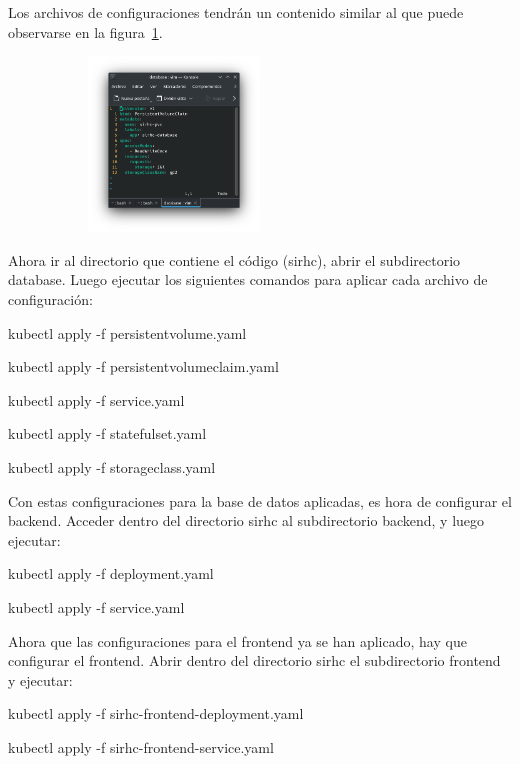 \documentclass[twoside]{article}
\begin{document}
Los archivos de configuraciones tendrán un contenido similar al que puede observarse en la figura~\ref{fig:configuracionKubernetes}.
\begin{figure}[H]
	\caption{Contenido de un archivo de configuración de kubernetes}
    \begin{subfigure}{1\textwidth}
	\includegraphics[width=0.5\textwidth]{configuracionKubernetesEjemplo.png}
    \end{subfigure}
	\label{fig:configuracionKubernetes}
\end{figure}
\vspace{-1.0\baselineskip}

Ahora ir al directorio que contiene el código (sirhc), abrir el subdirectorio database. Luego ejecutar los siguientes comandos para aplicar cada archivo de configuración:

kubectl apply -f persistentvolume.yaml

kubectl apply -f persistentvolumeclaim.yaml

kubectl apply -f service.yaml

kubectl apply -f statefulset.yaml

kubectl apply -f storageclass.yaml

Con estas configuraciones para la base de datos aplicadas, es hora de configurar el backend. Acceder dentro del directorio sirhc al subdirectorio backend, y luego ejecutar:

kubectl apply -f deployment.yaml

kubectl apply -f service.yaml

Ahora que las configuraciones para el frontend ya se han aplicado, hay que configurar el frontend. Abrir dentro del directorio sirhc el subdirectorio frontend y ejecutar:

kubectl apply -f sirhc-frontend-deployment.yaml

kubectl apply -f sirhc-frontend-service.yaml
\end{document}
